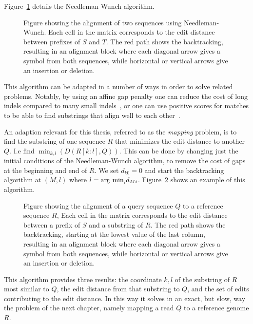 Figure~\ref{fig:needle} details the Needleman Wunch algorithm.
\begin{figure}
  \begin{tikzpicture}
    
  \end{tikzpicture}
  \caption{Figure showing the alignment of two sequences using Needleman-Wunch. Each cell in the matrix corresponds to the edit distance between prefixes of $S$ and $T$. The red path shows the backtracking, resulting in an alignment block where each diagonal arrow gives a symbol from both sequences, while horizontal or vertical arrows give an insertion or deletion.}
  \label{fig:needle}
\end{figure}

This algorithm can be adapted in a number of ways in order to solve related problems.
Notably, by using an affine gap penalty one can reduce the cost of long indels compared to many small indels~\cite{affine}, or one can use positive scores for matches to be able to find substrings that align well to each other~\cite{smithwaterman}.

An adaption relevant for this thesis, referred to as the \emph{mapping} problem, is to find the substring of one sequence $R$ that minimizes the edit distance to another $Q$.
I.e find $\min_{k, l}(D(R[k:l], Q))$.
This can be done by changing just the initial conditions of the Needleman-Wunch algorithm, to remove the cost of gaps at the beginning and end of $R$.
We set $d_{k0} = 0$ and start the backtracking algorithm at $(M, l)$ where $l=\argmin_i d_{Mi}$.
Figure~\ref{fig:needlemanmap} shows an example of this algorithm.
\begin{figure}
  \begin{tikzpicture}
    
  \end{tikzpicture}
  \caption{
    Figure showing the alignment of a query sequence $Q$ to a reference sequence $R$, 
    Each cell in the matrix corresponds to the edit distance between a prefix of $S$ and a substring of $R$. The red path shows the backtracking, starting at the lowest value of the last column, resulting in an alignment block where each diagonal arrow gives a symbol from both sequences, while horizontal or vertical arrows give an insertion or deletion.}
  \label{fig:needlemanmap}
\end{figure}
This algorithm provides three results: the coordinate $k, l$ of the substring of $R$ most similar to $Q$, the edit distance from that substring to $Q$, and the set of edits contributing to the edit distance.
In this way it solves in an exact, but slow, way the problem of the next chapter, namely mapping a read $Q$ to a reference genome $R$.

